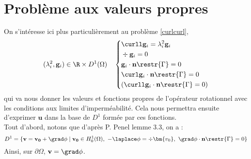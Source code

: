 \section{Problème aux valeurs propres}
\label{eigen}
On s'intéresse ici plus particulièrement au problème \ref{curlcurl},
\begin{equation*}
(\lambda_i^2,\mathbf{g}_i)\in\R\times D^1(\Omega)\quad \left\{\begin{aligned}
&\curll  \mathbf{g}_i = \lambda_i^2 \mathbf{g}_i\\
&\div \mathbf{g}_i = 0\\
&\mathbf{g}_i\cdot \mathbf{n}\restr{\Gamma} = 0\\
&\curl \mathbf{g}_i\cdot \mathbf{n}\restr{\Gamma} = 0\\
&(\curll  \mathbf{g}_i\cdot \mathbf{n}\restr{\Gamma} = 0)
\end{aligned}\right.
\end{equation*}
qui va nous donner les valeurs et fonctions propres de l'opérateur rotationnel avec les conditions aux limites d'imperméabilité. Cela nous permettra ensuite d'exprimer $\mathbf{u}$ dans la base de $D^1$ formée par ces fonctions.\\

Tout d'abord, notons que d'après P. Penel \cite{Penel2004} lemme 3.3, on a :
\[ D^1 = \{\mathbf{v}=\mathbf{v_0}+\grad\phi\; |\; \mathbf{v_0}\in H^1_0(\Omega),\ -\laplace\phi=\div\bm{v_0},\ \grad\phi\cdot \mathbf{n}\restr{\Gamma} = 0 \} \]
Ainsi, sur $\partial\Omega$, $\mathbf{v}=\grad\phi$.\\


